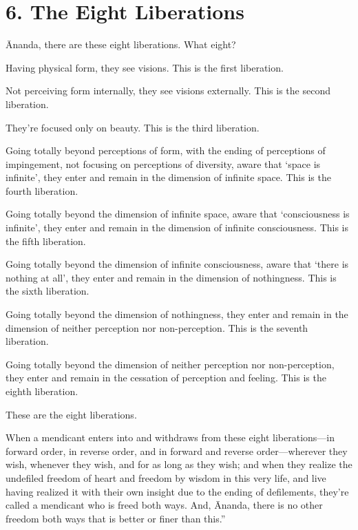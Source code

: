 \documentclass[12pt,openany]{book}%
\begin{document}
\section*{6. The Eight Liberations }

Ānanda, there are these eight liberations. What eight? 

Having physical form, they see visions. This is the first liberation. 

Not perceiving form internally, they see visions externally. This is the second liberation. 

They’re focused only on beauty. This is the third liberation. 

Going totally beyond perceptions of form, with the ending of perceptions of impingement, not focusing on perceptions of diversity, aware that ‘space is infinite’, they enter and remain in the dimension of infinite space. This is the fourth liberation. 

Going totally beyond the dimension of infinite space, aware that ‘consciousness is infinite’, they enter and remain in the dimension of infinite consciousness. This is the fifth liberation. 

Going totally beyond the dimension of infinite consciousness, aware that ‘there is nothing at all’, they enter and remain in the dimension of nothingness. This is the sixth liberation. 

Going totally beyond the dimension of nothingness, they enter and remain in the dimension of neither perception nor non-perception. This is the seventh liberation. 

Going totally beyond the dimension of neither perception nor non-perception, they enter and remain in the cessation of perception and feeling. This is the eighth liberation. 

These are the eight liberations. 

When a mendicant enters into and withdraws from these eight liberations—in forward order, in reverse order, and in forward and reverse order—wherever they wish, whenever they wish, and for as long as they wish; and when they realize the undefiled freedom of heart and freedom by wisdom in this very life, and live having realized it with their own insight due to the ending of defilements, they’re called a mendicant who is freed both ways. And, Ānanda, there is no other freedom both ways that is better or finer than this.” 
\end{document}
